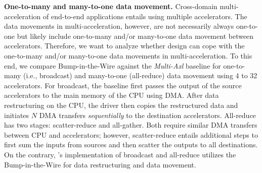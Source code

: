 \noindent \textbf{One-to-many and many-to-one data movement.}
%
Cross-domain multi-acceleration of end-to-end applications entails using multiple accelerators.
%
The data movements in multi-acceleration, however, are not necessarily always one-to-one but likely include one-to-many and/or many-to-one data movement between accelerators.
%
Therefore, we want to analyze whether \dmx design can cope with the one-to-many and/or many-to-one data movements in multi-acceleration.
%
To this end, we compare Bump-in-the-Wire \drx against the \emph{Multi-Axl} baseline for one-to-many (i.e., broadcast) and many-to-one (all-reduce) data movement using 4 to 32 accelerators.
%
For broadcast, the baseline first passes the output of the source accelerators to the main memory of the CPU using DMA.
%
After data restructuring on the CPU, the driver then copies the restructured data and initiates $N$ DMA transfers \emph{sequentially} to the destination accelerators. 
%
All-reduce has two stages: scatter-reduce and all-gather.
%
Both require similar DMA transfers between CPU and accelerators; however, scatter-reduce entails additional steps to first sum the inputs from sources and then scatter the outputs to all destinations. 
%
On the contrary, \dmx's implementation of broadcast and all-reduce utilizes the Bump-in-the-Wire \drx for data restructuring and data movement.
%

